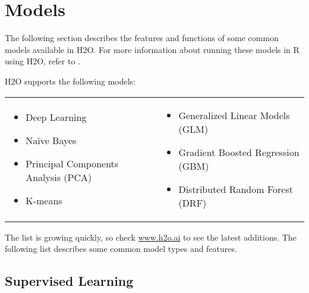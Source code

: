 {{\section{Models}

The following section describes the features and functions of some common models available in H2O.  For more information about running these models in R using H2O, refer to {\textbf{}}. 


\begin{minipage}{\textwidth}
H2O supports the following models:  


\begin{frame}%

\begin{tabular}{p{5.4cm}p{5.4cm}}

\begin{itemize}
 \item Deep Learning
  \item Na\"{i}ve Bayes
  \item Principal Components Analysis (PCA)
  \item K-means
\end{itemize} &

\begin{itemize}
     \item Generalized Linear Models (GLM) 
     \item Gradient Boosted Regression (GBM)
  \item Distributed Random Forest (DRF)
\end{itemize}

\end{tabular}

\end{frame}
\end{minipage}

The list is growing quickly, so check \url{www.h2o.ai} to see the latest additions. The following list describes some common model types and features. 

\subsection{Supervised Learning}

}}
